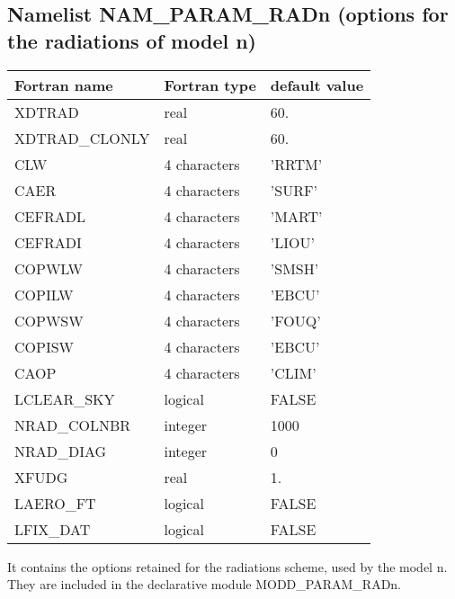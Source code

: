 \subsection{Namelist NAM\_PARAM\_RADn (options for the radiations of model n)}

\begin{longtable} {|p{}|p{}|p{}|}
\hline
Fortran name &  Fortran type & default value \\
\hline 
\endhead
\hline
\endfoot
XDTRAD         &  real          & 60. \\
XDTRAD\_CLONLY &  real          & 60. \\
CLW            &  4 characters  & 'RRTM'   \\
CAER           &  4 characters  & 'SURF'   \\
CEFRADL        &  4 characters  & 'MART'   \\
CEFRADI        &  4 characters  & 'LIOU'   \\
COPWLW         &  4 characters  & 'SMSH'   \\
COPILW         &  4 characters  & 'EBCU'   \\
COPWSW         &  4 characters  & 'FOUQ'   \\
COPISW         &  4 characters  & 'EBCU'   \\
CAOP           &  4 characters  & 'CLIM'   \\
LCLEAR\_SKY    & logical        & FALSE  \\
NRAD\_COLNBR   & integer        & 1000   \\
NRAD\_DIAG     & integer        & 0  \\
XFUDG          & real           &   1.   \\
LAERO\_FT      & logical        & FALSE  \\
LFIX\_DAT      & logical        & FALSE  \\
\end{longtable}

It contains the options retained for the radiations scheme, used by the 
model n. They are
included in the declarative module MODD\_PARAM\_RADn.

